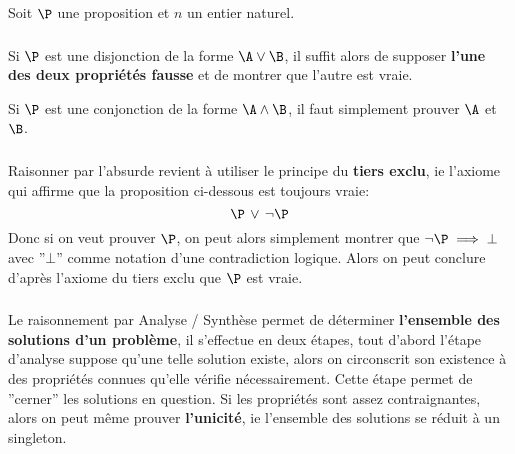 \chapter*{}

Soit \(\P\) une proposition et \(n\) un entier naturel.

\subsection*{}

Si \(\P\) est une disjonction de la forme \(\A \lor \B\), il suffit alors de supposer \textbf{l'une des deux propriétés fausse} et de montrer que l'autre est vraie.\<

Si \(\P\) est une conjonction de la forme \(\A \land \B\), il faut simplement prouver \(\A\) et \(\B\).

\subsection*{}

Raisonner par l'absurde revient à utiliser le principe du \textbf{tiers exclu}, ie l'axiome qui affirme que la proposition ci-dessous est toujours vraie:
\[
   \P \, \lor \, \lnot \P
\]
Donc si on veut prouver \(\P\), on peut alors simplement montrer que \(\lnot\P \implies \bot\) avec ''\(\bot\)'' comme notation d'une contradiction logique. Alors on peut conclure d'après l'axiome du tiers exclu que \(\P\) est vraie. 

\subsection*{}

Le raisonnement par Analyse / Synthèse permet de déterminer \textbf{l'ensemble des solutions d'un problème}, il s'effectue en deux étapes, tout d'abord l'étape d'analyse suppose qu'une telle solution existe, alors on circonscrit son existence à des propriétés connues qu'elle vérifie nécessairement. Cette étape permet de ''cerner'' les solutions en question. Si les propriétés sont assez contraignantes, alors on peut même prouver \textbf{l'unicité}, ie l'ensemble des solutions se réduit à un singleton.\<


